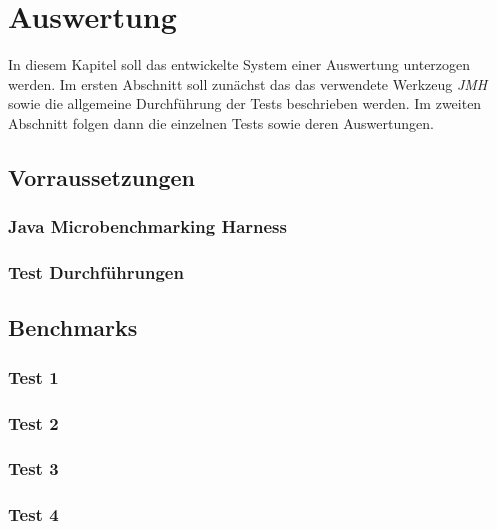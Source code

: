 \chapter{Auswertung}

In diesem Kapitel soll das entwickelte System einer Auswertung unterzogen werden.
Im ersten Abschnitt soll zunächst das das verwendete Werkzeug \textit{JMH} sowie 
die allgemeine Durchführung der Tests beschrieben werden. Im zweiten Abschnitt 
folgen dann die einzelnen Tests sowie deren Auswertungen.

\section{Vorraussetzungen}

\subsection{Java Microbenchmarking Harness}

\subsection{Test Durchführungen}

\section{Benchmarks}

\subsection{Test 1}

\subsection{Test 2}

\subsection{Test 3}
\subsection{Test 4}